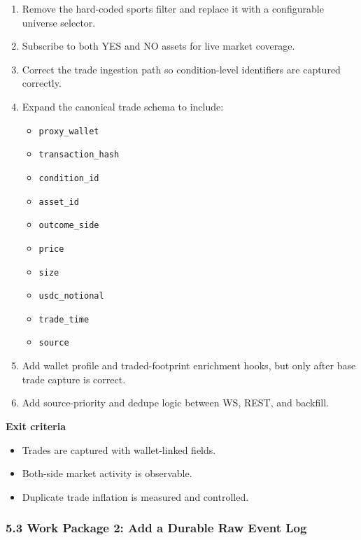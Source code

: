 \documentclass[
]{article}
\providecommand{\tightlist}{%
  \setlength{\itemsep}{0pt}\setlength{\parskip}{0pt}}
\begin{document}
\begin{enumerate}
\def\labelenumi{\arabic{enumi}.}
\tightlist
\item
  Remove the hard-coded sports filter and replace it with a configurable
  universe selector.
\item
  Subscribe to both YES and NO assets for live market coverage.
\item
  Correct the trade ingestion path so condition-level identifiers are
  captured correctly.
\item
  Expand the canonical trade schema to include:

  \begin{itemize}
  \tightlist
  \item
    \texttt{proxy\_wallet}
  \item
    \texttt{transaction\_hash}
  \item
    \texttt{condition\_id}
  \item
    \texttt{asset\_id}
  \item
    \texttt{outcome\_side}
  \item
    \texttt{price}
  \item
    \texttt{size}
  \item
    \texttt{usdc\_notional}
  \item
    \texttt{trade\_time}
  \item
    \texttt{source}
  \end{itemize}
\item
  Add wallet profile and traded-footprint enrichment hooks, but only
  after base trade capture is correct.
\item
  Add source-priority and dedupe logic between WS, REST, and backfill.
\end{enumerate}

\textbf{Exit criteria}

\begin{itemize}
\tightlist
\item
  Trades are captured with wallet-linked fields.
\item
  Both-side market activity is observable.
\item
  Duplicate trade inflation is measured and controlled.
\end{itemize}

\subsubsection{5.3 Work Package 2: Add a Durable Raw Event
Log}\label{53-work-package-2-add-a-durable-raw-event-log}
\end{document}
